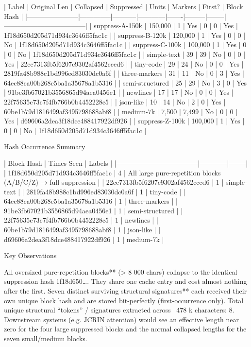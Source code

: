 {{{| Label                 | Original Len | Collapsed | Suppressed | Units | Markers | First? | Block Hash                         |
|-----------------------|--------------|-----------|------------|-------|---------|--------|------------------------------------|
| suppress-A-150k       | 150,000      | 1         | Yes        | 0     | 0       | Yes    | 1f18d650d205d71d934c3646ff5fac1c |
| suppress-B-120k       | 120,000      | 1         | Yes        | 0     | 0       | No     | 1f18d650d205d71d934c3646ff5fac1c |
| suppress-C-100k       | 100,000      | 1         | Yes        | 0     | 0       | No     | 1f18d650d205d71d934c3646ff5fac1c |
| simple-text           | 39           | 39        | No         | 0     | 0       | Yes    | 22ce7313fb5f6207c9302af4562cced6 |
| tiny-code             | 29           | 24        | No         | 0     | 0       | Yes    | 2819fa48b988c1bd996ed83030dc0a6f |
| three-markers         | 31           | 11        | No         | 0     | 3       | Yes    | 64ec88ca00b268e5ba1a35678a1b5316 |
| semi-structured       | 25           | 29        | No         | 3     | 0       | Yes    | 91be3fb67021b3556865d94aea0456e1 |
| newlines              | 17           | 17        | No         | 0     | 0       | Yes    | 22f75635c73c7f4fb766b0b4452228c5 |
| json-like             | 10           | 14        | No         | 2     | 0       | Yes    | 60be1b79d1816499af3495798688abf8 |
| medium-7k             | 7,500        | 7,499     | No         | 0     | 0       | Yes    | d69606a2dea3f18dce488417922df926 |
| suppress-Z-100k       | 100,000      | 1         | Yes        | 0     | 0       | No     | 1f18d650d205d71d934c3646ff5fac1c |

Hash Occurrence Summary

| Block Hash                         | Times Seen | Labels |
|------------------------------------|------------|--------|
| 1f18d650d205d71d934c3646ff5fac1c | 4          | All large pure-repetition blocks (A/B/C/Z) → full suppression |
| 22ce7313fb5f6207c9302af4562cced6 | 1          | simple-text |
| 2819fa48b988c1bd996ed83030dc0a6f | 1          | tiny-code |
| 64ec88ca00b268e5ba1a35678a1b5316 | 1          | three-markers |
| 91be3fb67021b3556865d94aea0456e1 | 1          | semi-structured |
| 22f75635c73c7f4fb766b0b4452228c5 | 1          | newlines |
| 60be1b79d1816499af3495798688abf8 | 1          | json-like |
| d69606a2dea3f18dce488417922df926 | 1          | medium-7k |

Key Observations

All oversized pure-repetition blocks** (> 8 000 chars) collapse to the identical suppression hash 1f18d650…. They share one cache entry and cost almost nothing after the first.
Seven distinct surviving structural signatures** each received their own unique block hash and are stored bit-perfectly (first-occurrence only).
Total unique structural “tokens” / signatures extracted across ~478 k characters: 8.
Downstream systems (e.g. JCRIN attention) would see an effective length near zero for the four large suppressed blocks and the normal collapsed lengths for the seven small/medium blocks.

}}}
